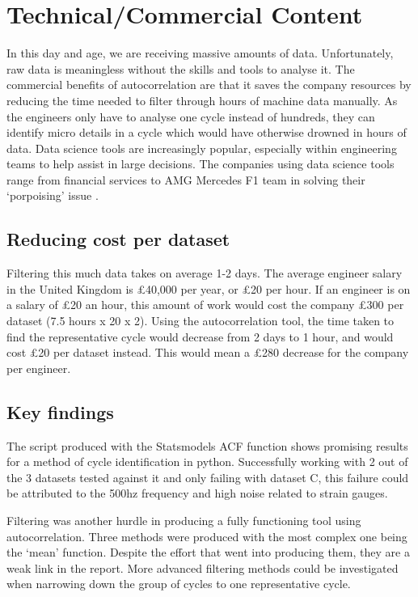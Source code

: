\section{Technical/Commercial Content}
In this day and age, we are receiving massive amounts of data. Unfortunately, raw data is meaningless without the skills and tools to analyse it.
The commercial benefits of autocorrelation are that it saves the company resources by reducing the time needed to filter through hours of machine data manually. As the engineers only have to analyse one cycle instead of hundreds, they can identify micro details in a cycle which would have otherwise drowned in hours of data. Data science tools are increasingly popular, especially within engineering teams to help assist in large decisions. The companies using data science tools range from financial services to AMG Mercedes F1 team in solving their `porpoising' issue \cite{mercedes}. 

\subsection{Reducing cost per dataset}
Filtering this much data takes on average 1-2 days. The average engineer salary in the United Kingdom is £40,000 per year, or £20 per hour. If an engineer is on a salary of £20 an hour, this amount of work would cost the company £300 per dataset (7.5 hours x 20 x 2). Using the autocorrelation tool, the time taken to find the representative cycle would decrease from 2 days to 1 hour, and would cost £20 per dataset instead. This would mean a £280 decrease for the company per engineer. 

\subsection{Key findings}
The script produced with the Statsmodels ACF function shows promising results for a method of cycle identification in python. Successfully working with 2 out of the 3 datasets tested against it and only failing with dataset C, this failure could be attributed to the 500hz frequency and high noise related to strain gauges. 


Filtering was another hurdle in producing a fully functioning tool using autocorrelation. Three methods were produced with the most complex one being the `mean' function. Despite the effort that went into producing them, they are a weak link in the report. More advanced filtering methods could be investigated when narrowing down the group of cycles to one representative cycle. 

